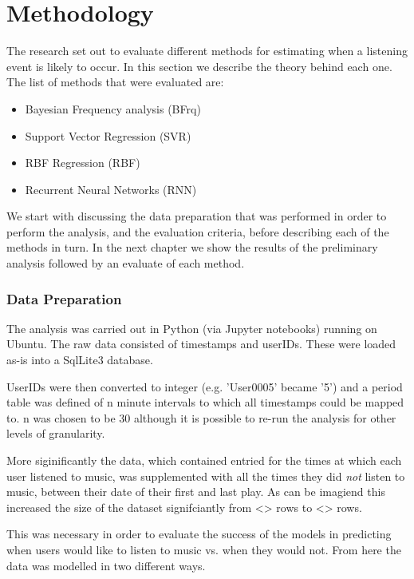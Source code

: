 
\chapter{Methodology} %

\label{Chapter3} %

The research set out to evaluate different methods for estimating when a listening event is likely to occur. In this section we describe the theory behind each one. The list of methods that were evaluated are:

\begin{itemize}
	\item Bayesian Frequency analysis (BFrq)
	\item Support Vector Regression (SVR)
	\item RBF Regression (RBF)
	\item Recurrent Neural Networks (RNN)
\end{itemize}

We start with discussing the data preparation that was performed in order to perform the analysis, and the evaluation criteria, before describing each of the methods in turn. In the next chapter we show the results of the preliminary analysis followed by an evaluate of each method.

\subsection{Data Preparation}

The analysis was carried out in Python (via Jupyter notebooks) running on Ubuntu. The raw data consisted of timestamps and userIDs. These were loaded as-is into a SqlLite3 database.

UserIDs were then converted to integer (e.g. 'User0005' became '5') and a period table was defined of n minute intervals to which all timestamps could be mapped to. n was chosen to be 30 although it is possible to re-run the analysis for other levels of granularity.

More siginificantly the data, which contained entried for the times at which each user listened to music, was supplemented with all the times they did \emph{not} listen to music, between their date of their first and last play. As can be imagiend this increased the size of the dataset signifciantly from <> rows to <> rows.

This was necessary in order to evaluate the success of the models in predicting when users would like to listen to music vs. when they would not. From here the data was modelled in two different ways. 

